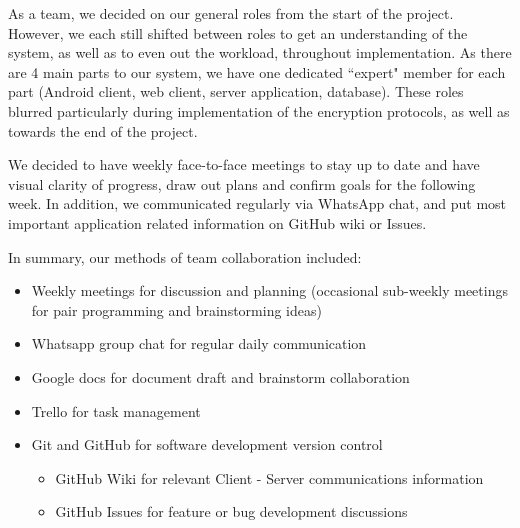 As a team, we decided on our general roles from the start of the project. However, we each still shifted between roles to get an understanding of the system, as well as to even out the workload, throughout implementation. As there are 4 main parts to our system, we have one dedicated ``expert" member for each part (Android client, web client, server application, database). These roles blurred particularly during implementation of the encryption protocols, as well as towards the end of the project. 

We decided to have weekly face-to-face meetings to stay up to date and have visual clarity of progress, draw out plans and confirm goals for the following week. In addition, we communicated regularly via WhatsApp chat, and put most important application related information on GitHub wiki or Issues. 

In summary, our methods of team collaboration included:
\begin{itemize}
\item Weekly meetings for discussion and planning (occasional sub-weekly meetings for pair programming and brainstorming ideas) 
\item Whatsapp group chat for regular daily communication
\item Google docs for document draft and brainstorm collaboration
\item Trello for task management
\item Git and GitHub for software development version control
\begin{itemize}
\item GitHub Wiki for relevant Client - Server communications information
\item GitHub Issues for feature or bug development discussions
\end{itemize}
\end{itemize}